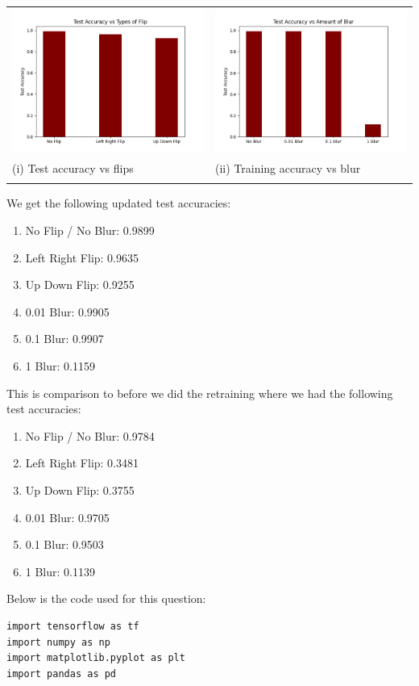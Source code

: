 \documentclass{article}
\begin{document}
\begin{titlepage}
\begin{tabular}{ll}
 \includegraphics[width=.5\linewidth]{flip2.png} &  \includegraphics[width=.5\linewidth]{blur2.png}\\
 \hfil (i) Test accuracy vs flips \hfil & \hfil (ii) Training accuracy vs blur \hfil \\\\
 
\end{tabular}
We get the following updated test accuracies:
\begin{enumerate}
  \item No Flip / No Blur: 0.9899
  \item Left Right Flip: 0.9635
  \item Up Down Flip: 0.9255
  \item 0.01 Blur: 0.9905
  \item 0.1 Blur: 0.9907
  \item 1 Blur: 0.1159
\end{enumerate}
This is comparison to before we did the retraining where we had the following test accuracies:
\begin{enumerate}
  \item No Flip / No Blur: 0.9784
  \item Left Right Flip: 0.3481
  \item Up Down Flip: 0.3755
  \item 0.01 Blur: 0.9705
  \item 0.1 Blur: 0.9503
  \item 1 Blur: 0.1139
\end{enumerate}
\newpage
Below is the code used for this question:
\begin{lstlisting}
import tensorflow as tf
import numpy as np
import matplotlib.pyplot as plt
import pandas as pd


\end{lstlisting}
\end{titlepage}
\end{document}
